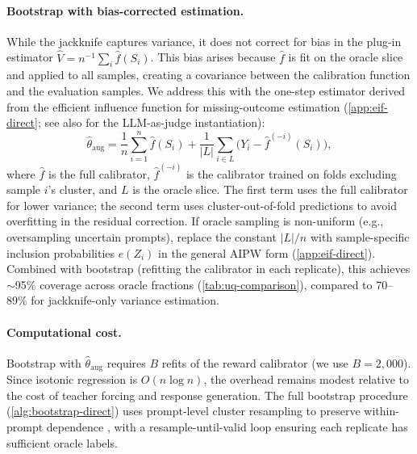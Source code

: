 \paragraph{Bootstrap with bias-corrected estimation.}
While the jackknife captures variance, it does not correct for bias in the plug-in estimator $\widehat V = n^{-1}\sum_i \hat f(S_i)$. This bias arises because $\hat f$ is fit on the oracle slice and applied to all samples, creating a covariance between the calibration function and the evaluation samples. We address this with the one-step estimator derived from the efficient influence function for missing-outcome estimation (\cref{app:eif-direct}; see also \citet{Chen2026EfficientLLMJudge} for the LLM-as-judge instantiation):
\begin{equation}
\label{eq:theta-aug}
\hat\theta_{\mathrm{aug}} = \frac{1}{n}\sum_{i=1}^n \hat f(S_i) + \frac{1}{|L|}\sum_{i \in L}\big(Y_i - \hat f^{(-i)}(S_i)\big),
\end{equation}
where $\hat f$ is the full calibrator, $\hat f^{(-i)}$ is the calibrator trained on folds excluding sample $i$'s cluster, and $L$ is the oracle slice. The first term uses the full calibrator for lower variance; the second term uses cluster-out-of-fold predictions to avoid overfitting in the residual correction. If oracle sampling is non-uniform (e.g., oversampling uncertain prompts), replace the constant $|L|/n$ with sample-specific inclusion probabilities $e(Z_i)$ in the general AIPW form (\cref{app:eif-direct}). Combined with bootstrap (refitting the calibrator in each replicate), this achieves ${\sim}$95\% coverage across oracle fractions (\cref{tab:uq-comparison}), compared to 70--89\% for jackknife-only variance estimation.

\paragraph{Computational cost.}
Bootstrap with $\hat\theta_{\mathrm{aug}}$ requires $B$ refits of the reward calibrator (we use $B{=}2{,}000$). Since isotonic regression is $O(n \log n)$, the overhead remains modest relative to the cost of teacher forcing and response generation. The full bootstrap procedure (\cref{alg:bootstrap-direct}) uses prompt-level cluster resampling to preserve within-prompt dependence \citep{CameronGelbachMiller2008}, with a resample-until-valid loop ensuring each replicate has sufficient oracle labels.